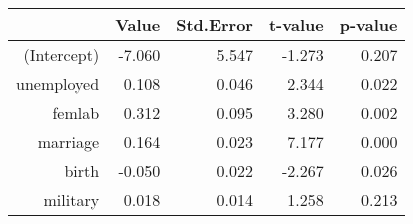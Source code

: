 \begin{table}[ht]
\centering
\begin{tabular}{rrrrr}
  \hline
 & Value & Std.Error & t-value & p-value \\ 
  \hline
(Intercept) & -7.060 & 5.547 & -1.273 & 0.207 \\ 
  unemployed & 0.108 & 0.046 & 2.344 & 0.022 \\ 
  femlab & 0.312 & 0.095 & 3.280 & 0.002 \\ 
  marriage & 0.164 & 0.023 & 7.177 & 0.000 \\ 
  birth & -0.050 & 0.022 & -2.267 & 0.026 \\ 
  military & 0.018 & 0.014 & 1.258 & 0.213 \\ 
   \hline
\end{tabular}
\end{table}
